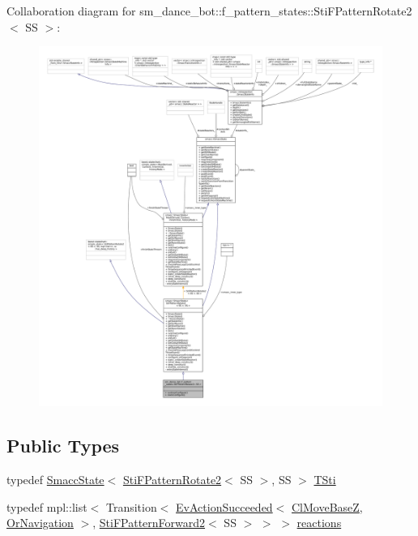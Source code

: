 Collaboration diagram for sm\+\_\+dance\+\_\+bot\+:\+:f\+\_\+pattern\+\_\+states\+:\+:Sti\+F\+Pattern\+Rotate2$<$ SS $>$\+:
\nopagebreak
\begin{figure}[H]
\begin{center}
\leavevmode
\includegraphics[width=350pt]{classsm__dance__bot_1_1f__pattern__states_1_1StiFPatternRotate2__coll__graph}
\end{center}
\end{figure}
\subsection*{Public Types}
\begin{DoxyCompactItemize}
\item 
typedef \hyperlink{classSmaccState}{Smacc\+State}$<$ \hyperlink{classsm__dance__bot_1_1f__pattern__states_1_1StiFPatternRotate2}{Sti\+F\+Pattern\+Rotate2}$<$ SS $>$, SS $>$ \hyperlink{classsm__dance__bot_1_1f__pattern__states_1_1StiFPatternRotate2_a38f721b63f2513b401cec57d938f7acf}{T\+Sti}
\item 
typedef mpl\+::list$<$ Transition$<$ \hyperlink{structsmacc_1_1default__events_1_1EvActionSucceeded}{Ev\+Action\+Succeeded}$<$ \hyperlink{classcl__move__base__z_1_1ClMoveBaseZ}{Cl\+Move\+BaseZ}, \hyperlink{classsm__dance__bot_1_1OrNavigation}{Or\+Navigation} $>$, \hyperlink{classsm__dance__bot_1_1f__pattern__states_1_1StiFPatternForward2}{Sti\+F\+Pattern\+Forward2}$<$ SS $>$ $>$ $>$ \hyperlink{classsm__dance__bot_1_1f__pattern__states_1_1StiFPatternRotate2_a89ab40aa874fa9b386c490af512ab0c0}{reactions}
\end{DoxyCompactItemize}
